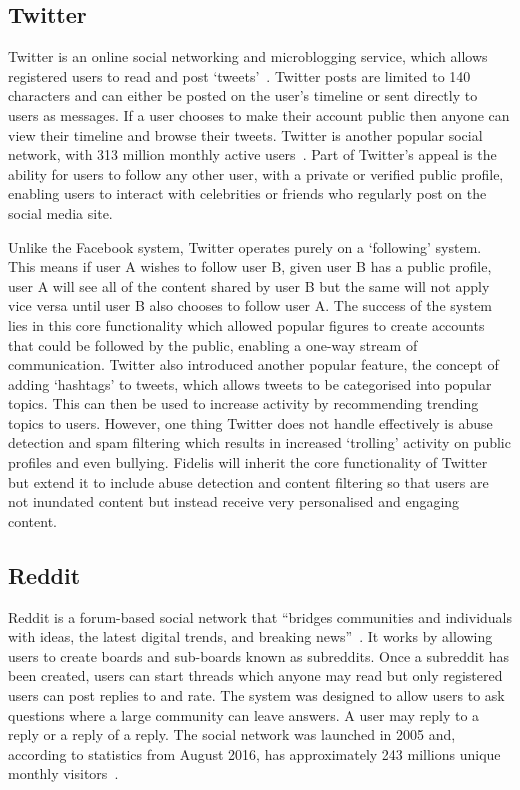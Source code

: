 \subsection{Twitter}
Twitter is an online social networking and microblogging service, which allows registered users to read and post `tweets'~\cite{Statista:Twitter}. Twitter posts are limited to 140 characters and can either be posted on the user's timeline or sent directly to users as messages. If a user chooses to make their account public then anyone can view their timeline and browse their tweets. Twitter is another popular social network, with 313 million monthly active users~\cite{Statista:Twitter, Twitter:About}. Part of Twitter's appeal is the ability for users to follow any other user, with a private or verified public profile, enabling users to interact with celebrities or friends who regularly post on the social media site.

Unlike the Facebook system, Twitter operates purely on a `following' system. This means if user A wishes to follow user B, given user B has a public profile, user A will see all of the content shared by user B but the same will not apply vice versa until user B also chooses to follow user A. The success of the system lies in this core functionality which allowed popular figures to create accounts that could be followed by the public, enabling a one-way stream of communication. Twitter also introduced another popular feature, the concept of adding `hashtags' to tweets, which allows tweets to be categorised into popular topics. This can then be used to increase activity by recommending trending topics to users. However, one thing Twitter does not handle effectively is abuse detection and spam filtering which results in increased `trolling' activity on public profiles and even bullying. Fidelis will inherit the core functionality of Twitter but extend it to include abuse detection and content filtering so that users are not inundated content but instead receive very personalised and engaging content.

\subsection{Reddit}
Reddit is a forum-based social network that ``bridges communities and individuals with ideas, the latest digital trends, and breaking news''~\cite{Reddit:About}. It works by allowing users to create boards and sub-boards known as subreddits. Once a subreddit has been created, users can start threads which anyone may read but only registered users can post replies to and rate. The system was designed to allow users to ask questions where a large community can leave answers. A user may reply to a reply or a reply of a reply. The social network was launched in 2005 and, according to statistics from August 2016, has approximately 243 millions unique monthly visitors~\cite{Statista:Reddit}.

